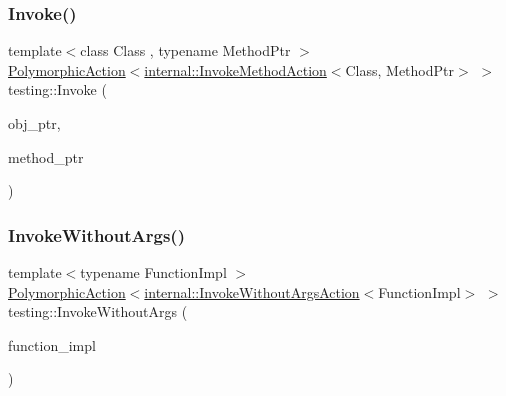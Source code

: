 \subsubsection{\texorpdfstring{Invoke()}{Invoke()}\hspace{0.1cm}{\footnotesize\ttfamily [2/2]}}
{\footnotesize\ttfamily template$<$class Class , typename Method\+Ptr $>$ \\
\hyperlink{classtesting_1_1_polymorphic_action}{Polymorphic\+Action}$<$\hyperlink{classtesting_1_1internal_1_1_invoke_method_action}{internal\+::\+Invoke\+Method\+Action}$<$Class, Method\+Ptr$>$ $>$ testing\+::\+Invoke (\begin{DoxyParamCaption}\item[{Class $\ast$}]{obj\+\_\+ptr,  }\item[{Method\+Ptr}]{method\+\_\+ptr }\end{DoxyParamCaption})}

\mbox{\label{namespacetesting_a88cc1999296bc630f6a49cdf66bb21f9}} 
\subsubsection{\texorpdfstring{Invoke\+Without\+Args()}{InvokeWithoutArgs()}\hspace{0.1cm}{\footnotesize\ttfamily [1/2]}}
{\footnotesize\ttfamily template$<$typename Function\+Impl $>$ \\
\hyperlink{classtesting_1_1_polymorphic_action}{Polymorphic\+Action}$<$\hyperlink{classtesting_1_1internal_1_1_invoke_without_args_action}{internal\+::\+Invoke\+Without\+Args\+Action}$<$Function\+Impl$>$ $>$ testing\+::\+Invoke\+Without\+Args (\begin{DoxyParamCaption}\item[{Function\+Impl}]{function\+\_\+impl }\end{DoxyParamCaption})}

\mbox{\label{namespacetesting_ab75325d71a8c37db94f349243815c728}} 
